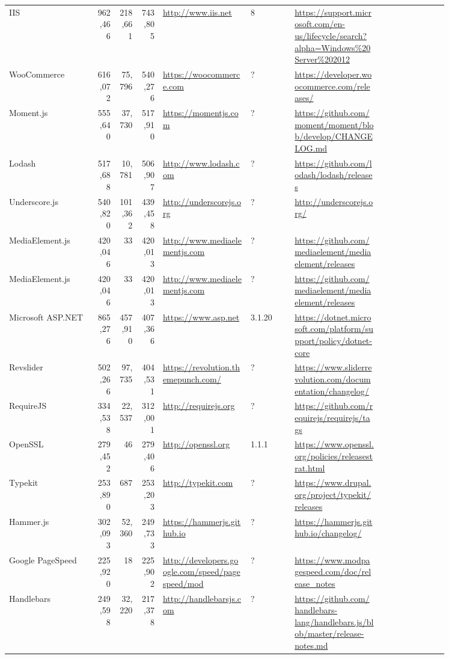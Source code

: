 \begin{longtable}{|p{0.2\linewidth}|r|r|r|p{0.2\linewidth}|p{0.1\linewidth}|p{0.2\linewidth}|p{0.15\linewidth}|}
	IIS &962,466 &218,661 &743,805 &\url{http://www.iis.net} &8 &\url{https://support.microsoft.com/en-us/lifecycle/search?alpha=Windows\%20Server\%202012} \\
	WooCommerce &616,072 &75,796 &540,276 &\url{https://woocommerce.com} &? &\url{https://developer.woocommerce.com/releases/} \\
	Moment.js &555,640 &37,730 &517,910 &\url{https://momentjs.com} &? &\url{https://github.com/moment/moment/blob/develop/CHANGELOG.md} \\
	Lodash &517,688 &10,781 &506,907 &\url{http://www.lodash.com} &? &\url{https://github.com/lodash/lodash/releases} \\
	Underscore.js &540,820 &101,362 &439,458 &\url{http://underscorejs.org} &? &\url{http://underscorejs.org/} \\
	MediaElement.js &420,046 &33 &420,013 &\url{http://www.mediaelementjs.com} &? &\url{https://github.com/mediaelement/mediaelement/releases} \\
	MediaElement.js &420,046 &33 &420,013 &\url{http://www.mediaelementjs.com} &? &\url{https://github.com/mediaelement/mediaelement/releases} \\
	Microsoft ASP.NET &865,276 &457,910 &407,366 &\url{https://www.asp.net} &3.1.20 &\url{https://dotnet.microsoft.com/platform/support/policy/dotnet-core} \\
	Revslider &502,266 &97,735 &404,531 &\url{https://revolution.themepunch.com/} &? &\url{https://www.sliderrevolution.com/documentation/changelog/} \\
	RequireJS &334,538 &22,537 &312,001 &\url{http://requirejs.org} &? &\url{https://github.com/requirejs/requirejs/tags} \\
	OpenSSL &279,452 &46 &279,406 &\url{http://openssl.org} &1.1.1 &\url{https://www.openssl.org/policies/releasestrat.html} \\
	Typekit &253,890 &687 &253,203 &\url{http://typekit.com} &? &\url{https://www.drupal.org/project/typekit/releases} \\
	Hammer.js &302,093 &52,360 &249,733 &\url{https://hammerjs.github.io} &? &\url{https://hammerjs.github.io/changelog/} \\
	Google PageSpeed &225,920 &18 &225,902 &\url{http://developers.google.com/speed/pagespeed/mod} &? &\url{https://www.modpagespeed.com/doc/release\_notes} \\
	Handlebars &249,598 &32,220 &217,378 &\url{http://handlebarsjs.com} &? &\url{https://github.com/handlebars-lang/handlebars.js/blob/master/release-notes.md} \\

\end{longtable}
